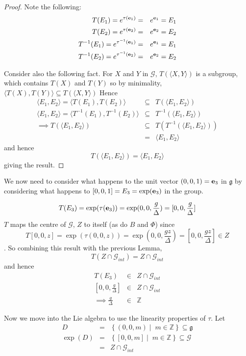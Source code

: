 \documentclass[honours]{UNSWthesis}
\newcommand{\Z}{\mathbb{Z}}
\newcommand{\G}{\mathcal{G}}
\newcommand{\g}{\mathfrak{g}}
\newcommand{\1}{\mathbf{e}_{1}}
\newcommand{\2}{\mathbf{e}_{3}}
\newcommand{\3}{\mathbf{e}_{3}}
\begin{document}
\begin{proof}
Note the following:
\begin{eqnarray*}
T(E_{1})= e^{\tau ({\bf e}_{1})} &=& e^{{\bf e}_{1}} = E_{1} \\
T(E_{2})= e^{\tau ({\bf e}_{2})} &=& e^{{\bf e}_{2}} = E_{2} \\
T^{-1}(E_{1})= e^{\tau^{-1} ({\bf e}_{1})} &=& e^{{\bf e}_{1}} = E_{1} \\
T^{-1}(E_{2})= e^{\tau^{-1} ({\bf e}_{2})} &=& e^{{\bf e}_{2}} = E_{2} 
\end{eqnarray*}

Consider also the following fact. For $X$ and $Y$ in $\G$, $T( \langle X,Y \rangle )$ is a subgroup, which contains $T(X)$ and $T(Y)$ so by minimality, $\langle T(X),T(Y) \rangle \subseteq T( \langle X,Y \rangle )$
Hence
\begin{eqnarray*}
\langle E_{1},E_{2} \rangle = \langle T(E_{1}),T(E_{2}) \rangle &\subseteq & T( \langle E_{1},E_{2} \rangle) \\
\langle E_{1},E_{2} \rangle = \langle T^{-1}(E_{1}),T^{-1}(E_{2}) \rangle & \subseteq & T^{-1}( \langle E_{1},E_{2} \rangle) \\
\implies T( \langle E_{1},E_{2} \rangle) & \subseteq & T(T^{-1}( \langle E_{1},E_{2} \rangle))\\
&=&\langle E_{1},E_{2} \rangle
\end{eqnarray*}
and hence 
\[
T( \langle E_{1},E_{2} \rangle)= \langle E_{1},E_{2}\rangle
\]
giving the result.
\end{proof}

We now need to consider what happens to the unit vector $(0,0,1)={\bf e}_{3}$ in $\g$ by considering what happens to $[0,0,1]=E_{3}=\exp({\bf e}_{3})$ in the group.

\[
T(E_{3})= \exp(\tau ({\bf e}_{3}))=\exp(0,0,\frac{g}{\Delta})=[0,0,\frac{g}{\Delta}]
\]
$T$ maps the centre of $\G$, $Z$ to itself (as do $B$ and $\Phi$) since 
\[
T[0,0,z]= \exp(\tau(0,0,z))= \exp(0,0,\frac{gz}{\Delta})=[0,0,\frac{gz}{\Delta}] \in Z
\]. So combining this result with the previous Lemma,
\[
T( Z \cap \G_{int})=Z \cap \G_{int}
\]
and hence 
\begin{eqnarray*}
T(E_{3}) &\in & Z \cap \G_{int} \\
\left[ 0,0,\frac{g}{\Delta} \right] &\in & Z \cap \G_{int} \\
\implies \frac{g}{\Delta} &\in & \Z
\end{eqnarray*}

Now we move into the Lie algebra to use the linearity properties of $\tau$.
Let 
\begin{eqnarray*}
D &=& \left\lbrace (0,0,m)\; \big| \;\; m \in \Z \right\rbrace \subseteq \g \\
\exp (D) &=& \left\lbrace [0,0,m] \; \big| \;\; m \in \Z \right\rbrace \subseteq \G \\
&=& Z \cap \G_{int}
\end{eqnarray*}
\end{document}
